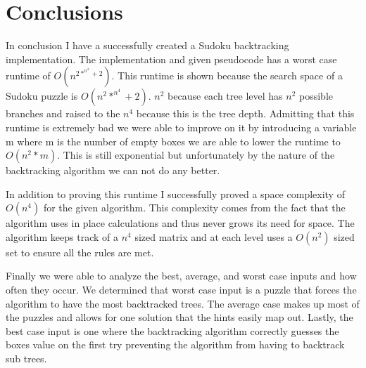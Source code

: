 \documentclass{sig-alternate}
\begin{document}
\section{Conclusions}
In conclusion I have a successfully created a Sudoku backtracking implementation. The implementation and given pseudocode has a worst case runtime of $O(n^{2*^{n^4} + 2})$. This runtime is shown because the search space of a Sudoku puzzle is $O(n^2*^{n^4} + 2)$. $n^2$ because each tree level has $n^2$ possible branches and raised to the $n^4$ because this is the tree depth. Admitting that this runtime is extremely bad we were able to improve on it by introducing a variable m where m is the number of empty boxes we are able to lower the runtime to $O(n^2*m)$. This is still exponential but unfortunately by the nature of the backtracking algorithm we can not do any better. 

In addition to proving this runtime I successfully proved a space complexity of $O(n^4)$ for the given algorithm. This complexity comes from the fact that the algorithm uses in place calculations and thus never grows its need for space. The algorithm keeps track of a $n^4$ sized matrix and at each level uses a $O(n^2)$ sized set to ensure all the rules are met.  

Finally we were able to analyze the best, average, and worst case inputs and how often they occur. We determined that worst case input is a puzzle that forces the algorithm to have the most backtracked trees. The average case makes up most of the puzzles and allows for one solution that the hints easily map out. Lastly, the best case input is one where the backtracking algorithm correctly guesses the boxes value on the first try preventing the algorithm from having to backtrack sub trees. 



%
\cite{*}

%
%
\end{document}
